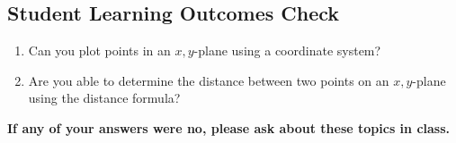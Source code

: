 \subsection{Student Learning Outcomes Check}

\begin{enumerate}
\item Can you plot points in an $x,y$-plane using a coordinate system?\\
\item Are you able to determine the distance between two points on an $x,y$-plane using the distance formula?\\
\end{enumerate}

\noindent \textbf{If any of your answers were no, please ask about these topics in class.}



